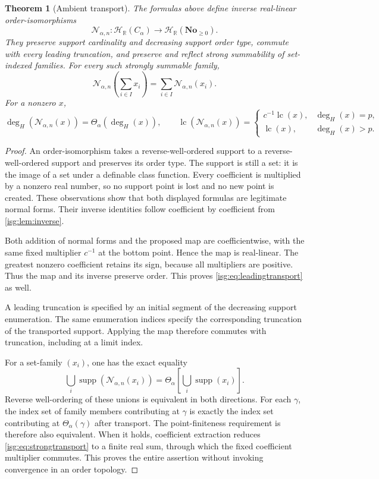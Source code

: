 \documentclass[11pt]{article}
\newtheorem{theorem}{Theorem}[section]
\theoremstyle{definition}
\theoremstyle{remark}
\newcommand{\No}{\ensuremath{\mathbf{No}}}
\newcommand{\R}{\mathbb{R}}
\newcommand{\supp}{\operatorname{supp}}
\newcommand{\Hahn}[2]{\mathcal{H}_{#1}(#2)}
\newcommand{\Rect}{\mathcal{N}_{\alpha,n}}
\newcommand{\tht}{\Theta_{\alpha}}
\newcommand{\lc}{\operatorname{lc}}
\newcommand{\hdeg}{\operatorname{deg}_{H}}
\begin{document}
\begin{theorem}[Ambient transport]\label{isg:thm:transport}
The formulas above define inverse real-linear order-isomorphisms
\[
 \Rect:\Hahn{\R}{C_\alpha}
       \longrightarrow\Hahn{\R}{\No_{\ge0}}.
\]
They preserve support cardinality and decreasing support order type,
commute with every leading truncation, and preserve and reflect strong
summability of set-indexed families. For every such strongly summable
family,
\begin{equation}\label{isg:eq:strongtransport}
 \Rect\left(\sum_{i\in I}x_i\right)
       =\sum_{i\in I}\Rect(x_i).
\end{equation}
For a nonzero $x$,
\begin{equation}\label{isg:eq:leadingtransport}
 \hdeg(\Rect(x))=\tht(\hdeg(x)),
 \qquad
 \lc(\Rect(x))=
 \begin{cases}
  c^{-1}\lc(x),&\hdeg(x)=p,\\
  \lc(x),&\hdeg(x)>p.
 \end{cases}
\end{equation}
\end{theorem}
\begin{proof}
An order-isomorphism takes a reverse-well-ordered support to a
reverse-well-ordered support and preserves its order type. The support is
still a set: it is the image of a set under a definable class function.
Every coefficient is multiplied by a nonzero real number, so no support
point is lost and no new point is created. These observations show that
both displayed formulas are legitimate normal forms. Their inverse
identities follow coefficient by coefficient from
\cref{isg:lem:inverse}.

Both addition of normal forms and the proposed map are coefficientwise,
with the same fixed multiplier $c^{-1}$ at the bottom point. Hence the
map is real-linear. The greatest nonzero coefficient retains its sign,
because all multipliers are positive. Thus the map and its inverse
preserve order. This proves \eqref{isg:eq:leadingtransport} as well.

A leading truncation is specified by an initial segment of the decreasing
support enumeration. The same enumeration indices specify the
corresponding truncation of the transported support. Applying the map
therefore commutes with truncation, including at a limit index.

For a set-family $(x_i)$, one has the exact equality
\[
 \bigcup_i\supp(\Rect(x_i))
 =\tht\left[\bigcup_i\supp(x_i)\right].
\]
Reverse well-ordering of these unions is equivalent in both directions.
For each $\gamma$, the index set of family members contributing at
$\gamma$ is exactly the index set contributing at $\tht(\gamma)$ after
transport. The point-finiteness requirement is therefore also equivalent.
When it holds, coefficient extraction reduces \eqref{isg:eq:strongtransport}
to a finite real sum, through which the fixed coefficient multiplier
commutes. This proves the entire assertion without invoking convergence
in an order topology.
\end{proof}
\end{document}
